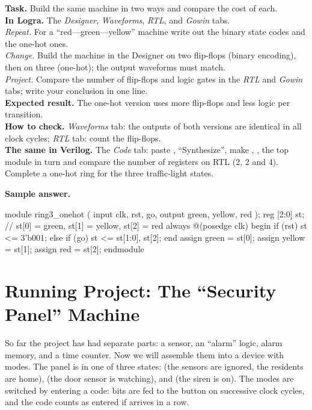 \begin{diybox}
\textbf{Task.} Build the same machine in two ways and compare the cost of
each.\\
\textbf{In Logra.} The \emph{Designer}, \emph{Waveforms}, \emph{RTL}, and
\emph{Gowin} tabs.\\
 \emph{Repeat.} For a ``red---green---yellow'' machine write out the
binary state codes and the one-hot ones.\\
 \emph{Change.} Build the machine in the Designer on two flip-flops
(binary encoding), then on three (one-hot); the output waveforms must
match.\\
 \emph{Project.} Compare the number of flip-flops and logic gates in
the \emph{RTL} and \emph{Gowin} tabs; write your conclusion in one line.\\
\textbf{Expected result.} The one-hot version uses more flip-flops and less
logic per transition.\\
\textbf{How to check.} \emph{Waveforms} tab: the outputs of both versions are
identical in all clock cycles; \emph{RTL} tab: count the flip-flops.\\
\textbf{The same in Verilog.} The \emph{Code} tab: paste ,
``Synthesize'', make , ,  the
top module in turn and compare the number of registers on RTL (2, 2 and 4).
 Complete a one-hot ring for the three traffic-light states.
\end{diybox}

\textbf{Sample answer.}
\begin{vcode}
module ring3_onehot (
    input      clk, rst, go,
    output     green, yellow, red
);
    reg [2:0] st;                       // st[0] = green, st[1] = yellow, st[2] = red
    always @(posedge clk) begin
        if (rst)     st <= 3'b001;
        else if (go) st <= {st[1:0], st[2]};
    end
    assign green  = st[0];
    assign yellow = st[1];
    assign red    = st[2];
endmodule
\end{vcode}


\section{Running Project: The ``Security Panel'' Machine}
\label{sec:panel-fsm}

So far the project has had separate parts: a sensor, an ``alarm'' logic, alarm
memory, and a time counter. Now we will assemble them into a device with modes.
The panel is in one of three states:  (the sensors are ignored,
the residents are home),  (the door sensor is watching), and
 (the siren is on). The modes are switched by entering a code: bits
are fed to the button on successive clock cycles, and the code counts as entered
if  arrives in a row.

